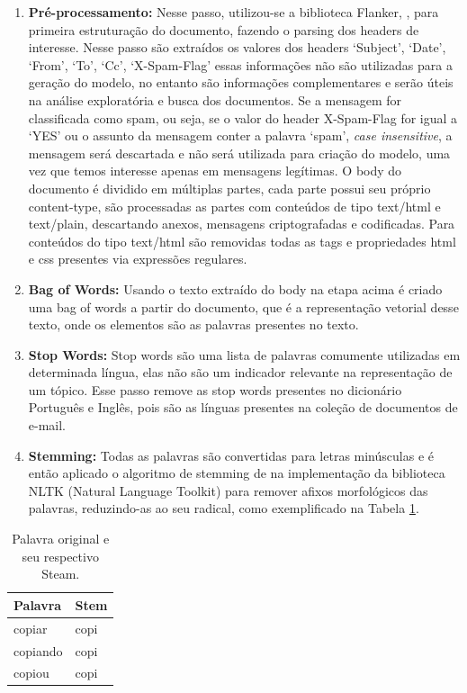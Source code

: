 \documentclass[12pt,a4paper]{article}
\begin{document}
\begin{enumerate}
\item \textbf{Pré-processamento:} Nesse passo, utilizou-se a biblioteca Flanker, , para primeira estruturação do documento, fazendo o parsing dos headers de interesse. Nesse passo são extraídos os valores dos headers ‘Subject’, ‘Date’, ‘From’, ‘To’, ‘Cc’, ‘X-Spam-Flag’ essas informações não são utilizadas para a geração do modelo,
 no entanto são informações complementares e serão úteis na análise exploratória e busca dos documentos. Se a mensagem for classificada como spam, ou seja, 
 se o valor do header X-Spam-Flag for igual a ‘YES’ ou o assunto da mensagem conter a palavra ‘spam’, \textit{case insensitive}, a mensagem será descartada e não será utilizada para criação do modelo,
 uma vez que temos interesse apenas em mensagens legítimas. O body do documento é dividido em múltiplas partes, cada parte possui seu próprio content-type,
 são processadas as partes com conteúdos de tipo text/html e text/plain, descartando anexos, mensagens criptografadas e codificadas. 
 Para conteúdos do tipo text/html são removidas todas as tags e propriedades html e css presentes via expressões regulares.
\item \textbf{Bag of Words:} Usando o texto extraído do body na etapa acima é criado uma bag of words a partir do documento, que é a representação vetorial desse texto,
 onde os elementos são as palavras presentes no texto.
\item \textbf{Stop Words:} Stop words são uma lista de palavras comumente utilizadas em determinada língua, elas não são um indicador relevante na representação de um tópico.
 Esse passo remove as stop words presentes no dicionário Português e Inglês, pois são as línguas presentes na coleção de documentos de e-mail.
\item \textbf{Stemming:} Todas as palavras são convertidas para letras minúsculas e é então aplicado o algoritmo de stemming de 
 na implementação da biblioteca NLTK (Natural Language Toolkit)  para remover afixos morfológicos das palavras, reduzindo-as ao seu radical, como exemplificado na Tabela \ref{tab-stem}.

\end{enumerate}

\begin{table}[H]
  \centering
  \begin{tabular}{l l}
  Palavra		&Stem \\
  \hline
  copiar		&copi \\
  copiando		&copi \\
  copiou		&copi \\
  \hline
  \end{tabular}
  \caption{Palavra original e seu respectivo Steam.}
  \label{tab-stem}
\end{table}
\end{document}
